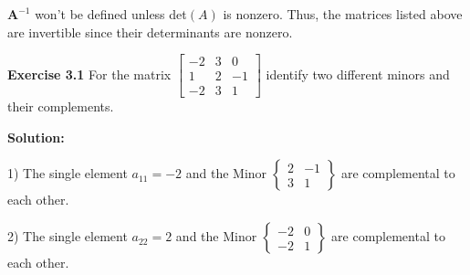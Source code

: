 \documentclass[11pt]{article}
\newcommand{\sol} {
  \textbf{Solution:}
}
\newcommand{\A} {
\mathbf{A}
}
\begin{document}
\(\A^{-1}\) won't be defined unless det\((A)\) is nonzero. Thus, the matrices listed above are invertible since their determinants are nonzero.

\bigskip

\noindent\textbf{Exercise 3.1} For the matrix $%
\begin{bmatrix}
-2 & 3 & 0\\
1 & 2 & -1\\
-2 & 3 & 1
\end{bmatrix}
$ identify two different minors and their complements.

\sol

1) The single element \(a_{11} = -2\) and the Minor
\(
\begin{Bmatrix}
2 & -1 \\
3 & 1
\end{Bmatrix}
\)
are complemental to each other.

2) The single element \(a_{22} = 2\) and the Minor
\(
\begin{Bmatrix}
-2 & 0 \\
-2 & 1
\end{Bmatrix}
\)
are complemental to each other.
\end{document}
